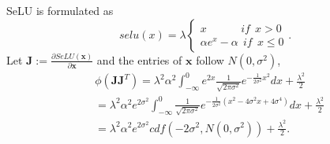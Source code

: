 \documentclass[10pt,journal,compsoc]{IEEEtran}
\begin{document}
SeLU is formulated as
\begin{equation}
    selu(x) = \lambda\left\{
             \begin{array}{lr}
             x~~~~~~~~~~~~~~if~~x>0  \\
             \alpha e^x-\alpha~~if~~x \le0
             \end{array}
\right. .
\end{equation}
Let $\mathbf{J}:=\frac{\partial SeLU(\mathbf{x})}{\partial \mathbf{x}}$ and the entries of $\mathbf{x}$ follow $N(0, \sigma^2)$,
\begin{equation}
\begin{split}
    & \phi(\mathbf{JJ}^T) = \lambda^2\alpha^2\int_{-\infty}^0e^{2x}\frac{1}{\sqrt{2\pi\sigma^2}}e^{-\frac{1}{2\sigma^2}x^2}dx + \frac{\lambda^2}{2}\\
    &=\lambda^2\alpha^2e^{2\sigma^2}\int_{-\infty}^0\frac{1}{\sqrt{2\pi\sigma^2}}e^{-\frac{1}{2\sigma^2}(x^2-4\sigma^2x+4\sigma^4)}dx + \frac{\lambda^2}{2}\\
    &=\lambda^2\alpha^2e^{2\sigma^2}cdf(-2\sigma^2, N(0, \sigma^2))+ \frac{\lambda^2}{2}.
\end{split}
\end{equation}
\begin{comment}
As we have
\begin{equation}
\begin{split}
    & cdf(-2\sigma^2, N(0, \sigma^2))=\int_{-\infty}^{-2\sigma^2}\frac{1}{\sqrt{2\pi\sigma^2}}e^{-\frac{1}{2\sigma^2}x^2}dx\\
    &  \overset{\sigma u=x}{=}\int_{-\infty}^{-2\sigma}\frac{1}{\sqrt{2\pi}}e^{-\frac{1}{2}u^2}du
\end{split}
\end{equation}
$\frac{\partial cdf(-2\sigma^2, N(0, \sigma^2))}{\partial \sigma^2} = -\frac{1}{\sqrt{2\pi\sigma^2}}e^{-2\sigma^2}$, and we have
\begin{equation}
\begin{split}
    &\frac{\partial \phi(\mathbf{JJ}^T)}{\partial \sigma^2}=\frac{\partial e^{2\sigma^2}}{\partial \sigma^2}\lambda^2\alpha^2cdf(-2\sigma^2, N(0, \sigma^2))\\
    & + \frac{\partial cdf(-2\sigma^2, N(0, \sigma^2))}{\partial \sigma^2}\lambda^2\alpha^2e^{2\sigma^2}\\
    &=2\lambda^2\alpha^2e^{2\sigma^2}cdf(-2\sigma^2, N(0, \sigma^2)) - \frac{\lambda^2\alpha^2}{\sqrt{2\pi\sigma^2}}
\end{split}
\end{equation}
\end{comment}
\end{document}
